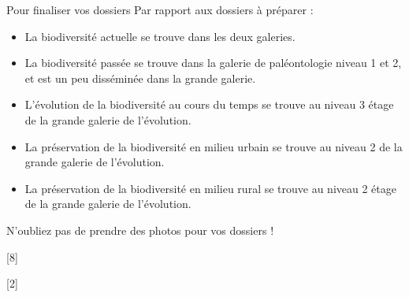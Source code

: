 \teteSndAP
{}


\begin{center}
\end{center}

\begin{doc}{Pour finaliser vos dossiers}
  Par rapport aux dossiers à préparer :
  \begin{itemize}
    \item La biodiversité actuelle se trouve dans les deux galeries.
    \item La biodiversité passée se trouve dans la galerie de paléontologie niveau 1 et 2, et est un peu disséminée dans la grande galerie.
    \item L’évolution de la biodiversité au cours du temps se trouve au niveau 3 étage de la grande galerie de l'évolution.
    \item La préservation de la biodiversité en milieu urbain se trouve au niveau 2 de la grande galerie de l'évolution.
    \item La préservation de la biodiversité en milieu rural se trouve au niveau 2 étage de la grande galerie de l'évolution.
  \end{itemize}
N'oubliez pas de prendre des photos pour vos dossiers !
\end{doc}

[8]

[2]

